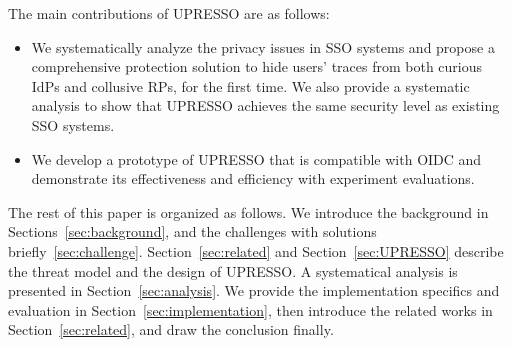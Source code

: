 The main contributions of UPRESSO are as follows:
\begin{itemize}
\item We systematically analyze the privacy issues in SSO systems and propose a comprehensive protection solution to hide users' traces from both curious IdPs and collusive RPs, for the first time. We also provide a systematic analysis to show that UPRESSO achieves the same security level as existing SSO systems.
\item We develop a prototype of UPRESSO that is compatible with OIDC and demonstrate its effectiveness and efficiency with experiment evaluations.
\end{itemize}



The rest of this paper is organized as follows. We introduce the background in Sections~\ref{sec:background}, and the challenges with solutions briefly~\ref{sec:challenge}. Section~\ref{sec:related} and Section~\ref{sec:UPRESSO} describe the threat model and the design of UPRESSO. A systematical analysis is presented in Section~\ref{sec:analysis}. We provide the implementation specifics and evaluation in Section~\ref{sec:implementation}, then introduce the related works in Section~\ref{sec:related}, and draw the conclusion finally.

